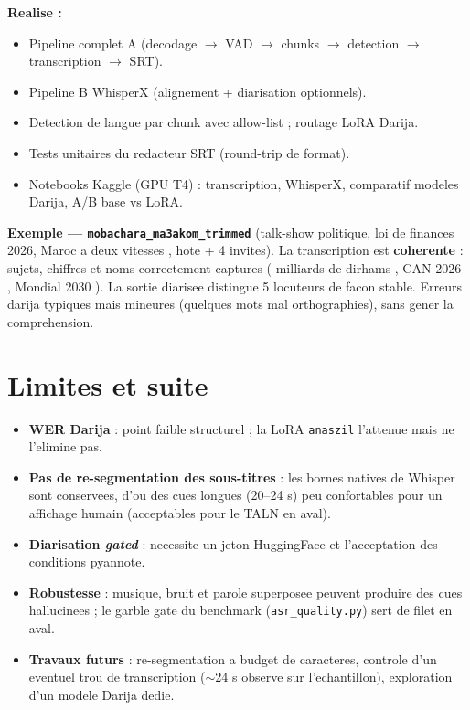 \documentclass[11pt, a4paper]{article}
\begin{document}
\textbf{Realise :}
\begin{itemize}
  \item Pipeline complet A (decodage $\rightarrow$ VAD $\rightarrow$ chunks $\rightarrow$ detection $\rightarrow$ transcription $\rightarrow$ SRT).
  \item Pipeline B WhisperX (alignement + diarisation optionnels).
  \item Detection de langue par chunk avec allow-list ; routage LoRA Darija.
  \item Tests unitaires du redacteur SRT (round-trip de format).
  \item Notebooks Kaggle (GPU T4) : transcription, WhisperX, comparatif modeles Darija, A/B base vs LoRA.
\end{itemize}

\textbf{Exemple — \texttt{mobachara\_ma3akom\_trimmed}} (talk-show politique, loi de
finances 2026, \og Maroc a deux vitesses \fg{}, hote + 4 invites). La transcription est
\textbf{coherente} : sujets, chiffres et noms correctement captures ( milliards de
dirhams \fg{}, \og CAN 2026 \fg{}, \og Mondial 2030 \fg{}). La sortie diarisee distingue 5
locuteurs de facon stable. Erreurs darija typiques mais mineures (quelques mots mal
orthographies), sans gener la comprehension.

\section{Limites et suite}

\begin{itemize}
  \item \textbf{WER Darija} : point faible structurel ; la LoRA \texttt{anaszil} l'attenue mais ne l'elimine pas.
  \item \textbf{Pas de re-segmentation des sous-titres} : les bornes natives de Whisper sont conservees, d'ou des cues longues (20--24 s) peu confortables pour un affichage humain (acceptables pour le TALN en aval).
  \item \textbf{Diarisation \emph{gated}} : necessite un jeton HuggingFace et l'acceptation des conditions pyannote.
  \item \textbf{Robustesse} : musique, bruit et parole superposee peuvent produire des cues hallucinees ; le \og garble gate \fg{} du benchmark (\texttt{asr\_quality.py}) sert de filet en aval.
  \item \textbf{Travaux futurs} : re-segmentation a budget de caracteres, controle d'un eventuel trou de transcription ($\sim$24 s observe sur l'echantillon), exploration d'un modele Darija dedie.
\end{itemize}
\end{document}
